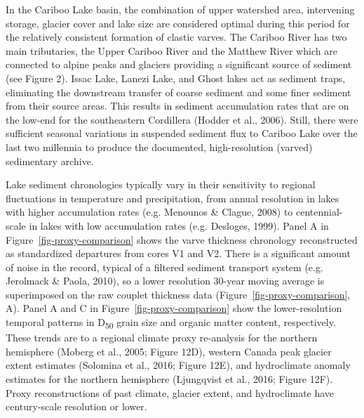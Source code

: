 \documentclass[
  letterpaper,
  DIV=11,
  numbers=noendperiod]{scrartcl}
\begin{document}
In the Cariboo Lake basin, the combination of upper watershed area,
intervening storage, glacier cover and lake size are considered optimal
during this period for the relatively consistent formation of clastic
varves. The Cariboo River has two main tributaries, the Upper Cariboo
River and the Matthew River which are connected to alpine peaks and
glaciers providing a significant source of sediment (see Figure 2).
Issac Lake, Lanezi Lake, and Ghost lakes act as sediment traps,
eliminating the downstream transfer of coarse sediment and some finer
sediment from their source areas. This results in sediment accumulation
rates that are on the low-end for the southeastern Cordillera (Hodder et
al., 2006). Still, there were sufficient seasonal variations in
suspended sediment flux to Cariboo Lake over the last two millennia to
produce the documented, high-resolution (varved) sedimentary archive.

Lake sediment chronologies typically vary in their sensitivity to
regional fluctuations in temperature and precipitation, from annual
resolution in lakes with higher accumulation rates (e.g. Menounos \&
Clague, 2008) to centennial-scale in lakes with low accumulation rates
(e.g. Desloges, 1999). Panel A in Figure~\ref{fig-proxy-comparison}
shows the varve thickness chronology reconstructed as standardized
departures from cores V1 and V2. There is a significant amount of noise
in the record, typical of a filtered sediment transport system (e.g.
Jerolmack \& Paola, 2010), so a lower resolution 30-year moving average
is superimposed on the raw couplet thickness data
(Figure~\ref{fig-proxy-comparison}, A). Panel A and C in
Figure~\ref{fig-proxy-comparison} show the lower-resolution temporal
patterns in D\textsubscript{50} grain size and organic matter content,
respectively. These trends are to a regional climate proxy re-analysis
for the northern hemisphere (Moberg et al., 2005; Figure 12D), western
Canada peak glacier extent estimates (Solomina et al., 2016; Figure
12E), and hydroclimate anomaly estimates for the northern hemisphere
(Ljungqvist et al., 2016; Figure 12F). Proxy reconstructions of past
climate, glacier extent, and hydroclimate have century-scale resolution
or lower.
\end{document}
